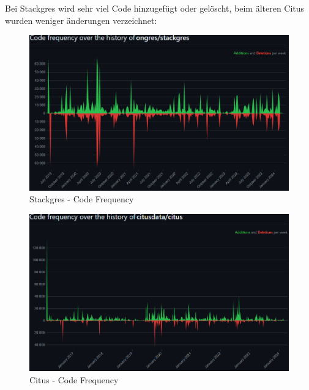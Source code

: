 \begin{flushleft}
    Bei Stackgres wird sehr viel Code hinzugefügt oder gelöscht, beim älteren Citus wurden weniger änderungen verzeichnet:
    \begin{figure}[H]
        \centering
        \includegraphics[width=0.75\linewidth]{source/implementation/evaluation/postgresql_ha_solutions/insights/stackgres_citus/code_frequency_ongres_stackgres}
        \caption{Stackgres - Code Frequency}
        \label{fig:code_frequency_ongres_stackgres}
    \end{figure}
    \begin{figure}[H]
        \centering
        \includegraphics[width=0.75\linewidth]{source/implementation/evaluation/postgresql_ha_solutions/insights/stackgres_citus/code_frequency_citusdata_citus}
        \caption{Citus - Code Frequency}
        \label{fig:code_frequency_citusdata_citus}
    \end{figure}


\end{flushleft}
